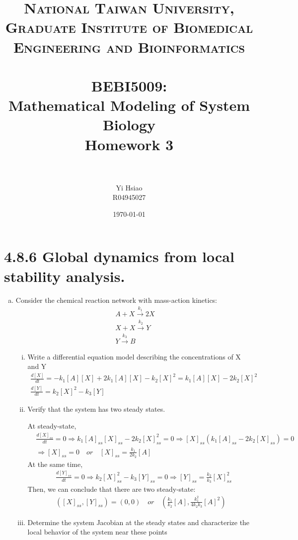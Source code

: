 \documentclass[paper=a4, fontsize=11pt]{scrartcl} %
\title{	
\normalfont \normalsize 
\textsc{National Taiwan University, \\ Graduate Institute of Biomedical Engineering and Bioinformatics} \\ [25pt] %
\horrule{0.5pt} \\[0.4cm] %
\huge BEBI5009:\\Mathematical Modeling of System Biology \\ Homework 3 \\ %
\horrule{2pt} \\[0.5cm] %
}
\author{Yi Hsiao\\R04945027} %
\date{\normalsize\today} %
\numberwithin{equation}{section} %
\numberwithin{figure}{section} %
\numberwithin{table}{section} %
\begin{document}
\maketitle %

\newpage
\section{4.8.6 Global dynamics from local stability analysis.}
	\begin{enumerate}[a)]
		\item Consider the chemical reaction network with mass-action kinetics:
		\begin{gather*}
			A + X \xrightarrow{k_1} 2X \\
			X + X \xrightarrow{k_2} Y \\
			Y \xrightarrow{k_3} B
		\end{gather*}
		\begin{enumerate}[i)]
			\item Write a differential equation model describing the concentrations of X and Y
			\begin{gather*}
				\frac{d[X]}{dt} = -k_1[A][X]+2k_1[A][X]-k_2[X]^2=k_1[A][X]-2k_2[X]^2\\
				\frac{d[Y]}{dt} = k_2[X]^2-k_3[Y]
			\end{gather*}

			\item Verify that the system has two steady states.

			At steady-state,
			\begin{align*}
				&\frac{d[X]_{ss}}{dt}=0 \Rightarrow k_1[A]_{ss}[X]_{ss}-2k_2[X]^2_{ss}=0 \Rightarrow [X]_{ss}(k_1[A]_{ss}-2k_2[X]_{ss})=0 \\
				&\Rightarrow [X]_{ss}=0 \quad or \quad [X]_{ss}=\frac{k_1}{2k_2}[A]
			\end{align*}
			At the same time,
			\begin{align*}
				&\frac{d[Y]_{ss}}{dt}=0 \Rightarrow k_2[X]^2_{ss}-k_3[Y]_{ss}=0 \Rightarrow [Y]_{ss}=\frac{k_2}{k_3}[X]^2_{ss}
			\end{align*}
			Then, we can conclude that there are two steady-state:
			\begin{align*}
				([X]_{ss},[Y]_{ss})=(0,0) \quad or \quad (\frac{k_1}{k_2}[A],\frac{k^2_1}{4k_2k_3}[A]^2)
			\end{align*}
			\item Determine the system Jacobian at the steady states and characterize the local behavior of the system near these points


\end{enumerate}
\end{enumerate}
\end{document}
